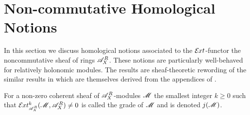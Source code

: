\section{Non-commutative Homological Notions}
In this section we discuss homological notions associated to the $\mathcal{E}\mkern -1mu xt$-functor the noncommutative sheaf of rings $\mathscr{A}_X^R$.
These notions are particularly well-behaved for relatively holonomic modules.
The results are sheaf-theoretic rewording of the similar results in \cite{budur2019zero} which are themselves derived from the appendices of \cite{bjork1993analytic}.
\begin{definition}
  For a non-zero coherent sheaf of $\mathscr{A}_X^R$-modules $\mathscr{M}$ the smallest integer $k\geq 0$ such that $\Ex{\A_X^R}{k}(\M,\A_X^R)\neq 0$ is called the grade of $\mathscr{M}$ and is denoted $j(\mathscr{M})$.
\end{definition}


